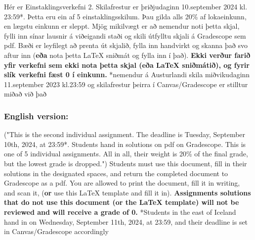 \noindent
Hér er Einstaklingsverkefni 2. Skilafrestur er þriðjudaginn 10.september 2024 kl. 23:59*. Þetta eru ein af 5 einstaklingsskilum. Þau gilda alls 20\% af lokaeinkunn, en lægstu einkunn er sleppt.
\vspace{2mm}
\newline
Mjög mikilvægt er að nemendur noti þetta skjal, fylli inn sínar lausnir á viðeigandi staði og skili útfylltu skjali á Gradescope sem pdf. Bæði er leyfilegt að prenta út skjalið, fylla inn handvirkt og skanna það svo aftur inn (\textbf{eða} nota þetta \LaTeX{} sniðmát og fylla inn í það). \textbf{Ekki verður farið yfir verkefni sem ekki nota þetta skjal (eða \LaTeX{} sniðmátið), og fyrir slík verkefni fæst 0 í einkunn.}
\vspace{2mm}
\newline
\footnotesize
*nemendur á Austurlandi skila miðvikudaginn 11.september 2023 kl.23:59 og skilafrestur þeirra í Canvas/Gradescope er stilltur miðað við það
\normalsize	
\subsubsection*{English version:}
("This is the second individual assignment. The deadline is Tuesday, September 10th, 2024, at 23:59*. Students hand in solutions on pdf on Gradescope. This is one of 5 individual assignments. All in all, their weight is 20\% of the final grade, but the lowest grade is dropped.")
\vspace{2mm}
\newline
Students must use this document, fill in their solutions in the designated spaces, and return the completed document to Gradescope as a pdf. You are allowed to print the document, fill it in writing, and scan it, (\textbf{or} use this \LaTeX{} template and fill it in). \textbf{Assignments solutions that do not use this document (or the \LaTeX{} template) will not be reviewed and will receive a grade of 0.}
\vspace{2mm}
\newline
\footnotesize
*Students in the east of Iceland hand in on Wednesday, September 11th, 2024, at 23:59, and their deadline is set in Canvas/Gradescope accordingly
\normalsize	
\newpage